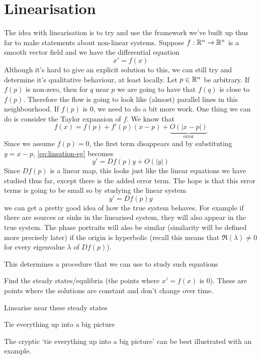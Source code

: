 \section{Linearisation}
The idea with linearisation is to try and use the framework we've built up thus far to make statements about non-linear systems.
Suppose $f: \mathbb{R}^n \to \mathbb{R}^n$ is a smooth vector field and we have the differential equation
\begin{equation}\label{eq:linsation-eg}
    x' = f(x)
\end{equation}
Although it's hard to give an explicit solution to this, we can still try and determine it's qualitative behaviour, at least locally. Let $p \in \mathbb{R}^n$ be arbitrary. If $f(p)$ is non-zero, then for $q$ near $p$ we are going to have that $f(q)$ is close to $f(p)$. Therefore the flow is going to look like (almost) parallel lines in this neighbourhood. If $f(p)$ is 0, we need to do a bit more work. One thing we can do is consider the Taylor expansion of $f$. We know that
$$ f(x) = f(p) + f'(p)(x - p) + \underbrace{O(|x - p|)}_{\text{error}} $$
Since we assume $f(p) = 0$, the first term disappears and by substituting $y = x - p$, \autoref{eq:linsation-eg} becomes
$$ y' = Df(p)y + O(|y|) $$
Since $Df(p)$ is a linear map, this looks just like the linear equations we have studied thus far, except there is the added error term. The hope is that this error terms is going to be small so by studying the linear system
$$ y' = Df(p) y $$
we can get a pretty good idea of how the true system behaves. For example if there are sources or sinks in the linearised system, they will also appear in the true system. The phase portraits will also be similar (similarity will be defined more precisely later) if the origin is hyperbolic (recall this means that $\Re(\lambda) \neq 0$ for every eigenvalue $\lambda$ of $Df(p)$).

This determines a procedure that we can use to study such equations
\begin{minenumerate}
    \item Find the steady states/equlibria (the points where $x' = f(x)$ is 0). These are points where the solutions are constant and don't change over time.
    \item Linearise near these steady states
    \item Tie everything up into a big picture
\end{minenumerate}
The cryptic `tie everything up into a big picture' can be best illustrated with an example.

